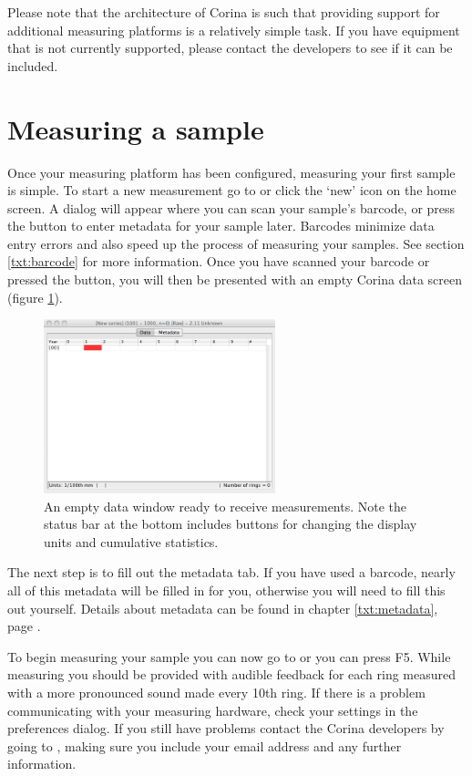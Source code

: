 Please note that the architecture of Corina is such that providing support for additional measuring platforms is a relatively simple task.  If you have equipment that is not currently supported, please contact the developers to see if it can be included.  


\section{Measuring a sample}

Once your measuring platform has been configured, measuring your first sample is simple.  To start a new measurement go to  or click the `new' icon on the home screen. A dialog will appear where you can scan your sample's barcode, or press the button to enter metadata for your sample later. Barcodes minimize data entry errors and also speed up the process of measuring your samples. See section \ref{txt:barcode} for more information. Once you have scanned your barcode or pressed the button, you will then be presented with an empty Corina data screen (figure \ref{fig:datascreen}).

\begin{figure}[hbtp]
  \centering
    \includegraphics[width=0.6\textwidth]{Images/datascreen.png}
    \caption{An empty data window ready to receive measurements.  Note the status bar at the bottom includes buttons for changing the display units and cumulative statistics.}
    \label{fig:datascreen}
\end{figure}

The next step is to fill out the metadata tab. If you have used a barcode, nearly all of this metadata will be filled in for you, otherwise you will need to fill this out yourself. Details about metadata can be found in chapter \ref{txt:metadata}, page \pageref{txt:metadata}.

To begin measuring your sample you can now go to  or you can press F5. While measuring you should be provided with audible feedback for each ring measured with a more pronounced sound made every 10th ring. If there is a problem communicating with your measuring hardware, check your settings in the preferences dialog. If you still have problems contact the Corina developers by going to , making sure you include your email address and any further information.


